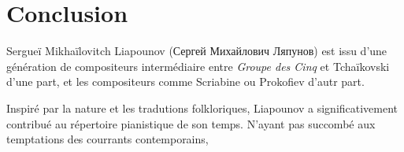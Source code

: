 
\chapter{Conclusion}

Sergueï Mikhaïlovitch Liapounov (\foreignlanguage{russian}{Сергей Михайлович Ляпунов}) est issu d'une génération de compositeurs intermédiaire entre \emph{Groupe des Cinq} et Tchaïkovski d'une part, et les compositeurs comme Scriabine ou Prokofiev d'autr part.

Inspiré par la nature et les tradutions folkloriques, Liapounov a significativement contribué au répertoire pianistique de son temps. N'ayant pas succombé aux temptations des courrants contemporains, 


